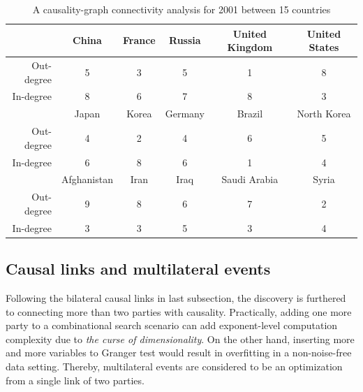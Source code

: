 \documentclass[runningheads,a4paper]{llncs}
\begin{document}
\begin{table}
\caption{A causality-graph connectivity analysis for 2001 between 15 countries}
\centering
\begin{tabular}{r c c c c c  }
\hline\hline
{} & China &  France & Russia & United Kingdom & United States   \\
\hline
Out-degree  & 5 &  3 & 5 & 1 & 8 \\
\hline
In-degree  & 8 & 6 & 7 & 8 & 3  \\
\hline
{} & Japan & Korea & Germany & Brazil & North Korea \\
\hline
Out-degree & 4 & 2 & 4   & 6 & 5 \\
\hline
In-degree & 6 & 8 & 6  & 1 & 4 \\
\hline
{}  & Afghanistan & Iran & Iraq & Saudi Arabia & Syria\\
\hline
Out-degree & 9 & 8 & 6 & 7 & 2\\
\hline
In-degree & 3 & 3 & 5 & 3 & 4 \\
\hline\hline
\end{tabular}
\label{tab:3}
\end{table}

\subsection{Causal links and multilateral events}

Following the bilateral causal links in last subsection, the discovery is furthered to connecting more than two parties with causality. Practically, adding one more party to a combinational search scenario can add exponent-level computation complexity due to {\em the curse of dimensionality}. On the other hand, inserting more and more variables to Granger test would result in overfitting in a non-noise-free data setting. Thereby, multilateral events are considered to be an optimization from a single link of two parties.  
\end{document}
